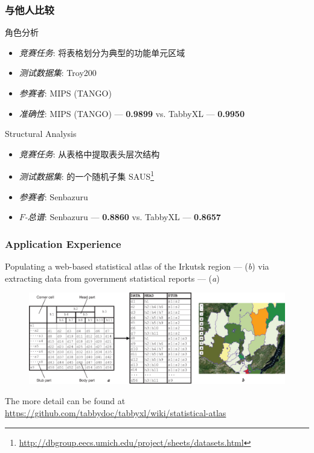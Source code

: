 \documentclass[10pt]{beamer}
\begin{document}
\begin{frame}
\frametitle{与他人比较}

\small{
\begin{block}{角色分析}
\begin{itemize}
\item \emph{竞赛任务}: 将表格划分为典型的功能单元区域
\item \emph{测试数据集}: Troy200  %
\item \emph{参赛者}: MIPS (TANGO) %
\item \emph{准确性}: MIPS (TANGO) --- \textbf{0.9899} vs. TabbyXL --- \textbf{0.9950}
\end{itemize}
\end{block}

\begin{block}{Structural Analysis}
\begin{itemize}
	\item \emph{竞赛任务}: 从表格中提取表头层次结构
	\item \emph{测试数据集}: 的一个随机子集 SAUS\footnote{\url{http://dbgroup.eecs.umich.edu/project/sheets/datasets.html}}
	\item \emph{参赛者}: Senbazuru %
	\item $F$\emph{-总谱}: Senbazuru --- \textbf{0.8860} vs. TabbyXL --- \textbf{0.8657}
\end{itemize}
\end{block}
}
\end{frame}


\begin{frame}
\frametitle{Application Experience}
Populating a web-based statistical atlas of the Irkutsk region --- (\textit{b}) via extracting data from government statistical reports --- (\textit{a})
\begin{figure}
\includegraphics[width=1\linewidth]{application1}
\end{figure}
\tiny{The more detail can be found at \url{https://github.com/tabbydoc/tabbyxl/wiki/statistical-atlas}}
\end{frame}
\end{document}
